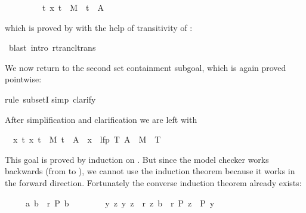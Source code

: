 \begin{isabellebody}
\begin{isamarkuptxt}
\begin{isabelle}
\ \ \ \ \ \ \ \ {\isasymLongrightarrow}\ {\isasymexists}t{\isachardot}\ {\isacharparenleft}x{\isacharcomma}\ t{\isacharparenright}\ {\isasymin}\ M\isactrlsup {\isacharasterisk}\ {\isasymand}\ t\ {\isasymin}\ A
\end{isabelle}
which is proved by  with the help of transitivity of \isa{\isactrlsup {\isacharasterisk}}:%
\end{isamarkuptxt}%
\ blast\ intro{\isacharcolon}\ rtrancl{\isacharunderscore}trans{\isacharparenright}%
\begin{isamarkuptxt}%
We now return to the second set containment subgoal, which is again proved
pointwise:%
\end{isamarkuptxt}%
rule\ subsetI{\isacharparenright}\isanewline
{}simp{\isacharcomma}\ clarify{\isacharparenright}%
\begin{isamarkuptxt}%
\noindent
After simplification and clarification we are left with
\begin{isabelle}%
\ {}{\isachardot}\ {\isasymAnd}x\ t{\isachardot}\ {\isasymlbrakk}{\isacharparenleft}x{\isacharcomma}\ t{\isacharparenright}\ {\isasymin}\ M\isactrlsup {\isacharasterisk}{\isacharsemicolon}\ t\ {\isasymin}\ A{\isasymrbrakk}\ {\isasymLongrightarrow}\ x\ {\isasymin}\ lfp\ {\isacharparenleft}{\isasymlambda}T{\isachardot}\ A\ {\isasymunion}\ M{\isasyminverse}\ {\isacharbackquote}{\isacharbackquote}{\isacharbackquote}\ T{\isacharparenright}%
\end{isabelle}
This goal is proved by induction on . But since the model
checker works backwards (from  to ), we cannot use the
induction theorem  because it works in the
forward direction. Fortunately the converse induction theorem
 already exists:
\begin{isabelle}%
\ \ \ \ \ {\isasymlbrakk}{\isacharparenleft}a{\isacharcomma}\ b{\isacharparenright}\ {\isasymin}\ r\isactrlsup {\isacharasterisk}{\isacharsemicolon}\ P\ b{\isacharsemicolon}\isanewline
\ \ \ \ \ \ \ \ {\isasymAnd}y\ z{\isachardot}\ {\isasymlbrakk}{\isacharparenleft}y{\isacharcomma}\ z{\isacharparenright}\ {\isasymin}\ r{\isacharsemicolon}\ {\isacharparenleft}z{\isacharcomma}\ b{\isacharparenright}\ {\isasymin}\ r\isactrlsup {\isacharasterisk}{\isacharsemicolon}\ P\ z{\isasymrbrakk}\ {\isasymLongrightarrow}\ P\ y{\isasymrbrakk}\isanewline

\end{isabelle}
\end{isamarkuptxt}
\end{isabellebody}
